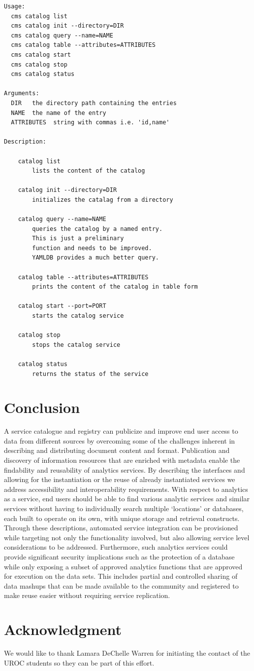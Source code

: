\documentclass[12pt]{article}
\begin{document}
\begin{verbatim}
Usage:
  cms catalog list
  cms catalog init --directory=DIR
  cms catalog query --name=NAME
  cms catalog table --attributes=ATTRIBUTES
  cms catalog start
  cms catalog stop
  cms catalog status

Arguments:
  DIR   the directory path containing the entries
  NAME  the name of the entry
  ATTRIBUTES  string with commas i.e. 'id,name'

Description:

    catalog list
        lists the content of the catalog

    catalog init --directory=DIR
        initializes the catalag from a directory

    catalog query --name=NAME
        queries the catalog by a named entry. 
        This is just a preliminary
        function and needs to be improved. 
        YAMLDB provides a much better query.

    catalog table --attributes=ATTRIBUTES
        prints the content of the catalog in table form

    catalog start --port=PORT
        starts the catalog service

    catalog stop
        stops the catalog service

    catalog status
        returns the status of the service

\end{verbatim}

\section{Conclusion}

A service catalogue and registry can publicize and improve end user access to data from different sources by overcoming some of the challenges inherent in describing and distributing document content and format. Publication and discovery of information resources that are enriched with metadata enable the findability and reusability of analytics services. By describing the interfaces and allowing for the instantiation or the reuse of already instantiated services we address accessibility and interoperability requirements. With respect to analytics as a service, end users should be able to find various analytic services and similar services without having to individually search multiple ‘locations’ or databases, each built to operate on its own, with unique storage and retrieval constructs. Through these descriptions, automated service integration can be provisioned while targeting not only the functionality involved, but also allowing service level considerations to be addressed. Furthermore, such analytics services could provide significant security implications such as the protection of a database while only exposing a subset of approved analytics functions that are approved for execution on the data sets. This includes partial and controlled sharing of data mashups that can be made available to the community and registered to make reuse easier without requiring service replication.

\section*{Acknowledgment}

We would like to thank Lamara DeChelle Warren for initiating the contact of the UROC students so they can be part of this effort. 



\end{document}
